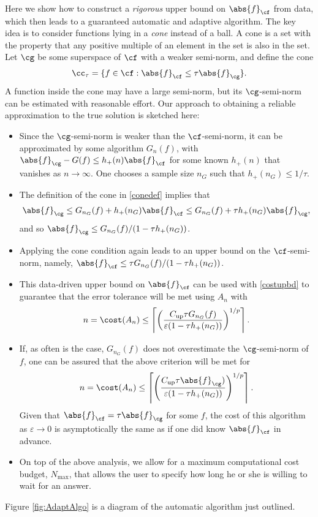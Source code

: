 \documentclass[]{elsarticle}
\DeclareMathOperator{\up}{up}
\theoremstyle{definition}
\theoremstyle{remark}
\newcommand{\Fnorm}[1]{\abs{#1}_{\cf}}
\newcommand{\Gnorm}[1]{\abs{#1}_{\cg}}
\begin{document}
Here we show how to construct a \emph{rigorous} upper bound on $\Fnorm{f}$ from data, which then leads to a guaranteed automatic and adaptive algorithm.  The key idea is to consider functions lying in a \emph{cone} instead of a ball.  A cone is a set with the property that any positive multiple of an element in the set is also in the set.  Let $\cg$ be some superspace of $\cf$ with a weaker semi-norm, and define the cone
\begin{equation} \label{conedef}
\cc_{\tau}=\{f \in \cf : \Fnorm{f} \le \tau \Gnorm{f} \}.
\end{equation}
A function inside the cone may have a large semi-norm, but its $\cg$-semi-norm can be estimated with reasonable effort.  Our approach to obtaining a reliable approximation to the true solution is sketched here:

\begin{itemize}
\item Since the $\cg$-semi-norm is weaker than the $\cf$-semi-norm, it can be approximated by some algorithm $G_n(f)$, with $\Gnorm{f}-G(f) \le h_+(n)\Fnorm{f}$ for some known $h_+(n)$ that vanishes as $n \to \infty$.  One chooses a sample size $n_G$ such that $h_+(n_G) \le 1/\tau$.

\item The definition of the cone in \eqref{conedef} implies that 
\[
\Gnorm{f} \le G_{n_G}(f)+ h_+(n_G)\Fnorm{f} \le G_{n_G}(f)+ \tau h_+(n_G)\Gnorm{f},
\]
and so $\Gnorm{f} \le G_{n_G}(f)/(1 - \tau h_+(n_G))$.

\item Applying the cone condition again leads to an upper bound on the $\cf$-semi-norm, namely,  $\Fnorm{f} \le \tau G_{n_G}(f)/(1 - \tau h_+(n_G))$.

\item This data-driven upper bound on $\Fnorm{f}$ can be used with \eqref{costupbd} to guarantee that the error tolerance will be met using $A_n$ with
\[
n=\cost(A_n)\le \left \lceil\left(\frac{ C_{\up}\tau G_{n_G}(f)}{\varepsilon(1 - \tau h_+(n_G))}\right)^{1/p} \right \rceil.
\]

\item If, as often is the case, $G_{n_G}(f)$ does not overestimate the $\cg$-semi-norm of $f$, one can be assured that the above criterion will be met for 
\[
n=\cost(A_n)\le \left \lceil\left(\frac{ C_{\up}\tau \Gnorm{f})}{\varepsilon(1 - \tau h_+(n_G))}\right)^{1/p} \right \rceil.
\]
Given that $\Fnorm{f} = \tau \Gnorm{f}$ for some $f$, the cost of this algorithm as $\varepsilon \to 0$ is asymptotically the same as if one did know $\Fnorm{f}$ in advance.

\item On top of the above analysis, we allow for a maximum computational cost budget, $N_{\max}$, that allows the user to specify how long he or she is willing to wait for an answer.

\end{itemize} 
Figure \ref{fig:AdaptAlgo} is a diagram of the automatic algorithm just outlined.
\end{document}
